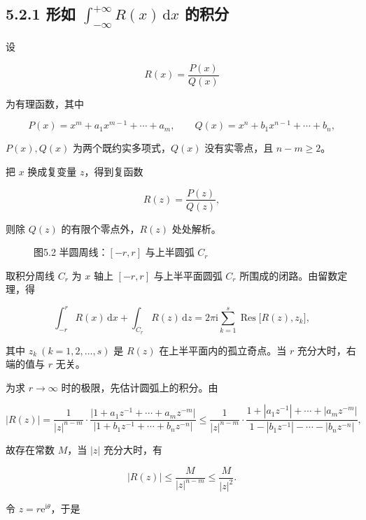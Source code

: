 \subsection{\texorpdfstring{5.2.1 形如
\(\displaystyle\int_{-\infty}^{+\infty}R(x)\,\mathrm dx\)
的积分}{5.2.1 形如 \textbackslash displaystyle\textbackslash int\_\{-\textbackslash infty\}\^{}\{+\textbackslash infty\}R(x)\textbackslash,\textbackslash mathrm dx 的积分}}\label{ux5f62ux5982-displaystyleint_-inftyinftyrxmathrm-dx-ux7684ux79efux5206}

设

\[
R(x)=\frac{P(x)}{Q(x)}
\]

为有理函数，其中

\[
P(x)=x^{m}+a_1x^{m-1}+\cdots+a_m,\qquad
Q(x)=x^{n}+b_1x^{n-1}+\cdots+b_n,
\]

\(P(x),Q(x)\) 为两个既约实多项式，\(Q(x)\) 没有实零点，且 \(n-m\ge2\)。

把 \(x\) 换成复变量 \(z\)，得到复函数

\[
R(z)=\frac{P(z)}{Q(z)},
\]

则除 \(Q(z)\) 的有限个零点外，\(R(z)\) 处处解析。

\begin{figure}
\centering
{}
\caption{图5.2 半圆周线：\([-r,r]\) 与上半圆弧 \(C_r\)}
\end{figure}

取积分周线 \(C_r\) 为 \(x\) 轴上 \([-r,r]\) 与上半平面圆弧 \(C_r\)
所围成的闭路。由留数定理，得

\[
\int_{-r}^{r}R(x)\,\mathrm dx+\int_{C_r}R(z)\,\mathrm dz
=2\pi\mathrm i\sum_{k=1}^{s}\operatorname{Res}\bigl[R(z),z_k\bigr],
\]

其中 \(z_k\ (k=1,2,\ldots,s)\) 是 \(R(z)\) 在上半平面内的孤立奇点。当
\(r\) 充分大时，右端的值与 \(r\) 无关。

为求 \(r\to\infty\) 时的极限，先估计圆弧上的积分。由

\[
|R(z)|=\frac{1}{|z|^{n-m}}\cdot\frac{\bigl|1+a_1z^{-1}+\cdots+a_mz^{-m}\bigr|}{\bigl|1+b_1z^{-1}+\cdots+b_nz^{-n}\bigr|}
\le\frac{1}{|z|^{n-m}}\cdot\frac{1+|a_1z^{-1}|+\cdots+|a_mz^{-m}|}{1-|b_1z^{-1}|-\cdots-|b_nz^{-n}|},
\]

故存在常数 \(M\)，当 \(|z|\) 充分大时，有

\[
|R(z)|\le\frac{M}{|z|^{n-m}}\le\frac{M}{|z|^{2}}.
\]

令 \(z=r\mathrm e^{\mathrm i\theta}\)，于是

